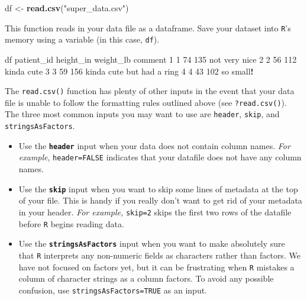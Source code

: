 \documentclass[
]{book}
\newenvironment{Shaded}{\begin{snugshade}}{\end{snugshade}}
\newcommand{\DecValTok}[1]{\textcolor[rgb]{0.00,0.00,0.81}{#1}}
\newcommand{\KeywordTok}[1]{\textcolor[rgb]{0.13,0.29,0.53}{\textbf{#1}}}
\newcommand{\NormalTok}[1]{#1}
\newcommand{\OperatorTok}[1]{\textcolor[rgb]{0.81,0.36,0.00}{\textbf{#1}}}
\newcommand{\StringTok}[1]{\textcolor[rgb]{0.31,0.60,0.02}{#1}}
\begin{document}
\begin{Shaded}
\begin{Highlighting}[]
\NormalTok{df <-}\StringTok{ }\KeywordTok{read.csv}\NormalTok{(}\StringTok{"super_data.csv"}\NormalTok{)}
\end{Highlighting}
\end{Shaded}

This function reads in your data file as a dataframe. Save your dataset into \texttt{R}'s memory using a variable (in this case, \texttt{df}).

\begin{Shaded}
\begin{Highlighting}[]
\NormalTok{df}
\NormalTok{  patient_id height_in weight_lb                   comment}
\DecValTok{1}          \DecValTok{1}        \DecValTok{74}       \DecValTok{135}\NormalTok{             not very nice}
\DecValTok{2}          \DecValTok{2}        \DecValTok{56}       \DecValTok{112}\NormalTok{                kinda cute}
\DecValTok{3}          \DecValTok{3}        \DecValTok{59}       \DecValTok{156}\NormalTok{ kinda cute but had a ring}
\DecValTok{4}          \DecValTok{4}        \DecValTok{43}       \DecValTok{102}\NormalTok{                 so small}\OperatorTok{!}
\end{Highlighting}
\end{Shaded}

The \texttt{read.csv()} function has plenty of other inputs in the event that your data file is unable to follow the formatting rules outlined above (see \texttt{?read.csv()}). The three most common inputs you may want to use are \texttt{header}, \texttt{skip}, and \texttt{stringsAsFactors}.

\begin{itemize}
\item
  Use the \textbf{\texttt{header}} input when your data does not contain column names. \emph{For example}, \texttt{header=FALSE} indicates that your datafile does not have any column names.
\item
  Use the \textbf{\texttt{skip}} input when you want to skip some lines of metadata at the top of your file. This is handy if you really don't want to get rid of your metadata in your header. \emph{For example,} \texttt{skip=2} skips the first two rows of the datafile before \texttt{R} begins reading data.
\item
  Use the \textbf{\texttt{stringsAsFactors}} input when you want to make absolutely sure that \texttt{R} interprets any non-numeric fields as characters rather than factors. We have not focused on factors yet, but it can be frustrating when \texttt{R} mistakes a column of character strings as a column factors. To avoid any possible confusion, use \texttt{stringsAsFactors=TRUE} as an input.
\end{itemize}
\end{document}

